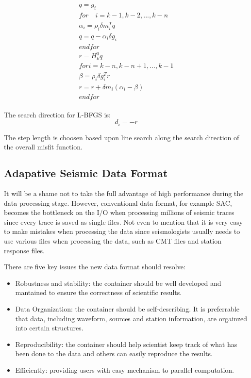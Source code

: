 \documentclass[extra,mreferee]{gji}
\begin{document}
\begin{align*}
q = g_i \\
for \quad i = k -1, k-2, ..., k-n \\
    \alpha_i = \rho_i \delta m_{i}^{T} q \\
    q = q - \alpha_i \delta g_i \\
end for\\
r = H_k^{0}q \\
for i = k-n, k-n+1, ..., k-1 \\
    \beta = \rho_i \delta g_i^{T}r \\
    r = r + \delta m_i(\alpha_i - \beta) \\
end for \\
\end{align*}

The search direction for L-BFGS is:
$$d_i = -r$$

The step length is choosen based upon line search along the search direction of the overall misfit function.

\subsection{Adapative Seismic Data Format}

It will be a shame not to take the full advantage of high performance during the data processing stage. However, conventional data format, for example SAC, becomes the bottleneck on the I/O when processing millions of seismic traces since every trace is saved as single files. Not even to mention that it is very easy to make mistakes when processing the data since seismologists usually needs to use various files when processing the data, such as CMT files and station response files.

There are five key issues the new data format should resolve:
\begin{itemize}
    \item Robustness and stability: the container should be well developed and mantained to ensure the correctness of scientific results.
    \item Data Organization: the container should be self-describing. It is preferrable that data, including waveform, sources and station information, are orgainzed into certain structures.
    \item Reproducibility: the container should help scientist keep track of what has been done to the data and others can easily reproduce the results.
    \item Efficiently: providing users with easy mechanism to parallel computation.

\end{itemize}
\end{document}
